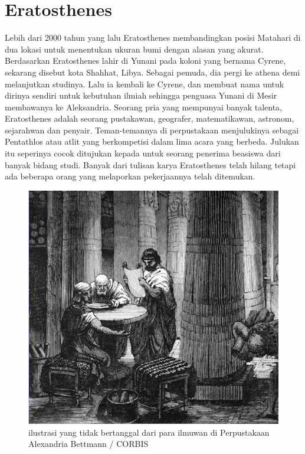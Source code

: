 
\section{Eratosthenes}
Lebih dari 2000 tahun yang lalu Eratosthenes membandingkan posisi Matahari di dua lokasi untuk menentukan ukuran bumi dengan alasan yang akurat.
Berdasarkan \cite{plochmann1983dictionary} Eratosthenes lahir di Yunani pada koloni yang bernama Cyrene, sekarang disebut kota Shahhat, Libya. Sebagai pemuda, dia  pergi ke athena demi melanjutkan studinya. Lalu ia kembali ke Cyrene, dan membuat nama untuk dirinya sendiri untuk kebutuhan ilmiah sehingga penguasa Yunani di Mesir membawanya ke Aleksandria.
Seorang pria yang mempunyai banyak talenta, Eratosthenes adalah seorang pustakawan, geografer, matematikawan, astronom, sejarahwan dan penyair. Teman-temannya di perpustakaan menjulukinya sebagai Pentathlos atau atlit yang berkompetisi dalam lima acara yang berbeda. Julukan itu seperinya cocok ditujukan kepada untuk seorang penerima beasiswa dari banyak bidang studi. Banyak dari tulisan karya Eratosthenes telah hilang tetapi ada beberapa orang yang melaporkan pekerjaannya telah ditemukan\cite{lasky2008librarian}.
\begin{figure}[ht]
	\centerline{\includegraphics[width=1\textwidth]{figures/illustrasi.jpg}}
	\caption{ilustrasi yang tidak bertanggal dari para ilmuwan di Perpustakaan Alexandria Bettmann / CORBIS}
	\label{illustrasi}
	\end{figure}
